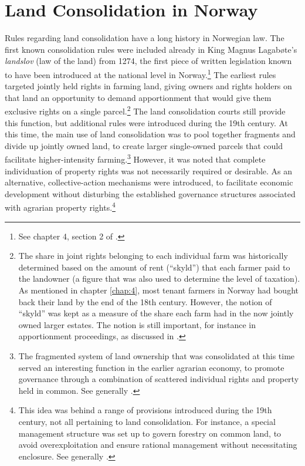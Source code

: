 
\section{Land Consolidation in Norway}\label{sec:6:3}

Rules regarding land consolidation have a long history in Norwegian law. The first known consolidation rules were included already in King Magnus Lagabøte's \emph{landslov} (law of the land) from 1274, the first piece of written legislation known to have been introduced at the national level in Norway.\footnote{See chapter 4, section 2 of \cite{nou02}.} The earliest rules targeted jointly held rights in farming land, giving owners and rights holders on that land an opportunity to demand apportionment that would give them exclusive rights on a single parcel.\footnote{The share in joint rights belonging to each individual farm was historically determined based on the amount of rent (``skyld'') that each farmer paid to the landowner (a figure that was also used to determine the level of taxation). As mentioned in chapter \ref{chap:4}, most tenant farmers in Norway had bought back their land by the end of the 18th century. However, the notion of ``skyld'' was kept as a measure of the share each farm had in the now jointly owned larger estates. The notion is still important, for instance in apportionment proceedings, as discussed in \cite{ravna09a}.} The land consolidation courts still provide this function, but additional rules were introduced during the 19th century. At this time, the main use of land consolidation was to pool together fragments and divide up jointly owned land, to create larger single-owned parcels that could facilitate higher-intensity farming.\footnote{The fragmented system of land ownership that was consolidated at this time served an interesting function in the earlier agrarian economy, to promote governance through a combination of scattered individual rights and property held in common. See generally \cite{smith00,smith02}.} However, it was noted that complete individuation of property rights was not necessarily required or desirable. As an alternative, collective-action mechanisms were introduced, to facilitate economic development without disturbing the established governance structures associated with agrarian property rights.\footnote{This idea was behind a range of provisions introduced during the 19th century, not all pertaining to land consolidation. For instance, a special management structure was set up to govern forestry on common land, to avoid overexploitation and ensure rational management without necessitating enclosure. See generally \cite{stenseth10a}.}

